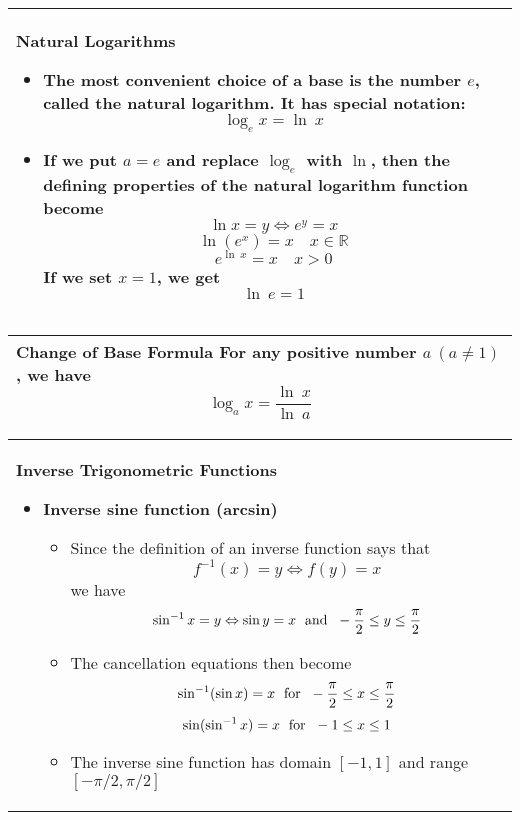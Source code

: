 \documentclass[fleqn]{article}
\begin{document}
\begin{center}
\def\arraystretch{1.3}
{\setlength{\tabcolsep}{16pt}
\begin{tabularx}{.9\textwidth}{|X|}
\hline
	\vspace{1pt}
	\textbf{Natural Logarithms}
	\begin{itemize}
	\item The most convenient choice of a base is the number $e$, called the \textbf{natural logarithm}. It has special notation:
	$$\log_e x = \ln \: x$$
	\item If we put $a = e$ and replace $\log_e$ with $\ln$, then the defining properties of the natural logarithm function become
	$$\ln x = y \Leftrightarrow e^y = x$$
	$$\ln(e^x) = x \hspace{12pt} x \in \mathbb{R}$$
	$$e^{\ln\:x} = x \hspace{12pt} x > 0$$
	If we set $x=1$, we get
	$$\ln \: e = 1$$
	
	\end{itemize}
	\\
\hline
\end{tabularx}}
\vspace{12pt}

\def\arraystretch{1.3}
{\setlength{\tabcolsep}{16pt}
\begin{tabularx}{.9\textwidth}{|X|}
\hline
	\vspace{1pt}
	\textbf{Change of Base Formula} \:\: For any positive number $a \: (a \ne 1)$, we have
	$$\log_a x = \dfrac{\ln \: x}{\ln \: a}$$
	\\
\hline
\end{tabularx}}
\vspace{12pt}


\def\arraystretch{1.3}
{\setlength{\tabcolsep}{16pt}
\begin{tabularx}{.9\textwidth}{|X|}
\hline
	\vspace{1pt}
	\textbf{Inverse Trigonometric Functions}
	\begin{itemize}
	\item \textbf{Inverse sine function (arcsin)}
	\begin{itemize}
		\item Since the definition of an inverse function says that
		$$f^{-1}(x) = y \Leftrightarrow f(y) = x$$
		we have
		$$\sin^{-1} x = y \Leftrightarrow \sin y = x \text{\hspace{3pt} and \hspace{3pt}} -\dfrac{\pi}{2} \le y \le \dfrac{\pi}{2}$$
		\item The cancellation equations then become
		$$\sin^{-1}(\sin x) = x \text{\hspace{3pt} for \hspace{3pt}} -\dfrac{\pi}{2} \le x \le \dfrac{\pi}{2}$$
		$$\sin(\sin^{-1} x) = x \text{\hspace{3pt} for \hspace{3pt}} -1 \le x \le 1$$
		\item The inverse sine function has domain $[-1, 1]$ and range $[-\pi/2, \pi/2]$
	\end{itemize}
	\vspace{5pt}


\end{itemize}
\end{tabularx}}
\end{center}
\end{document}
